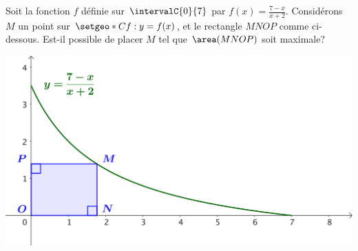 Soit la fonction $f$ définie sur $\intervalC{0}{7}$ par $f(x) = \frac{7-x}{x+2}$.
%
Considérons $M$ un point sur $\setgeo*{C}{f}: y = f(x)$, et le rectangle $MNOP$ comme ci-dessous. Est-il possible de placer $M$ tel que $\area(MNOP)$ soit maximale?

\smallskip

\begin{center}
	\includegraphics[scale=.67]{goal.png}
\end{center}